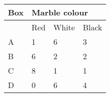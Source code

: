 \begin{table}[htb]
\begin{tabular}{|l|l|l|l|}\hline
\multicolumn{1}{|l|}{Box} & \multicolumn{3}{|l|}{Marble colour} \\\hline
        &Red    &White  &Black\\\hline
A       &1      &6      &3\\\hline
B       &6      &2      &2\\\hline
C       &8      &1      &1\\\hline
D       &0      &6      &4\\\hline
\end{tabular}
\end{table}
